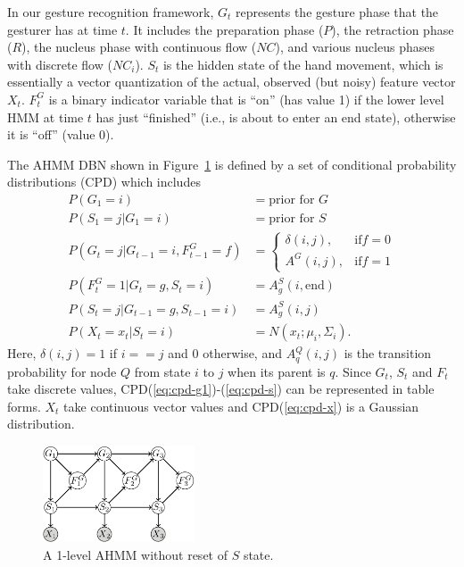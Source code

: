 \documentclass[10pt,twocolumn,letterpaper]{article}
\begin{document}
In our gesture recognition framework,
$G_t$ represents the gesture phase that the
gesturer has at time $t$. It includes the preparation phase ($P$), the retraction phase ($R$), 
the nucleus phase with continuous flow ($NC$), and various nucleus phases with discrete flow ($NC_i$). $S_t$ is the hidden
state of the hand movement, which is essentially a vector quantization of the actual, observed 
(but noisy) feature vector $X_t$. $F_t^G$ is a binary indicator variable that is
``on'' (has value 1) if the lower level HMM at time $t$ has just ``finished''
(i.e., is about to enter an end state), otherwise it is ``off'' (value 0).

The AHMM DBN shown in Figure~\ref{fig:ahmm} is defined by a set of conditional probability distributions (CPD) which
includes
\begin{align}
P(G_1 = i) &= \text{prior for } G \label{eq:cpd-g1} \\ 
P(S_1 = j | G_1 = i) &= \text{prior for } S \\
P(G_t = j| G_{t - 1} = i, F_{t - 1}^G = f) &= 
\begin{cases}
  \delta(i, j), & \text{if} f = 0 \\
  A^G(i, j), & \text{if} f = 1 
\end{cases} \\
P(F_t^G = 1 | G_t = g, S_t = i) &= A_g^S(i, \text{end}) \\
P(S_t = j | G_{t - 1} = g, S_{t - 1} = i) &= A_g^S(i, j) \label{eq:cpd-s}\\
P(X_t = x_t | S_t = i) &= N(x_t; \mu_i, \Sigma_i). \label{eq:cpd-x}
\end{align}
Here, $\delta(i, j) = 1$ if $i == j$ and $0$ otherwise, and $A^Q_q(i, j)$ is the
transition probability for node $Q$ from state $i$ to $j$ when its parent is $q$.
Since $G_t$, $S_t$ and $F_t$ take discrete values, CPD(\ref{eq:cpd-g1})-(\ref{eq:cpd-s})
can be represented in table forms. $X_t$ take continuous vector values and CPD(\ref{eq:cpd-x})
is a Gaussian distribution.

\begin{figure}[tb]
  \centering
  \includegraphics[width=0.4\textwidth]{figure/ahmm.png} 
  \caption{A 1-level AHMM without reset of $S$ state.}
  \label{fig:ahmm}
\end{figure}
\end{document}
